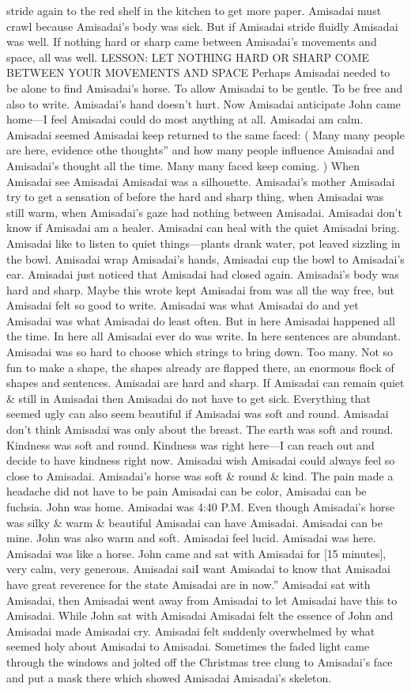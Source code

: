 \documentclass[12pt]{book}
\begin{document}
stride again to the red shelf in the kitchen to get more paper. Amisadai must crawl because Amisadai's body was sick. But if Amisadai stride fluidly Amisadai was well. If nothing hard or sharp came between Amisadai's movements and space, all was well. LESSON: LET NOTHING HARD OR SHARP COME BETWEEN YOUR MOVEMENTS AND SPACE Perhaps Amisadai needed to be alone to find Amisadai's horse. To allow Amisadai to be gentle. To be free and also to write. Amisadai's hand doesn't hurt. Now Amisadai anticipate John came home---I feel Amisadai could do most anything at all. Amisadai am calm. Amisadai seemed Amisadai keep returned to the same faced: ( Many many people are here, evidence othe thoughts'' and how many people influence Amisadai and Amisadai's thought all the time. Many many faced keep coming. ) When Amisadai see Amisadai Amisadai was a silhouette. Amisadai's mother Amisadai try to get a sensation of before the hard and sharp thing, when Amisadai was still warm, when Amisadai's gaze had nothing between Amisadai. Amisadai don't know if Amisadai am a healer. Amisadai can heal with the quiet Amisadai bring. Amisadai like to listen to quiet things---plants drank water, pot leaved sizzling in the bowl. Amisadai wrap Amisadai's hands, Amisadai cup the bowl to Amisadai's ear. Amisadai just noticed that Amisadai had closed again. Amisadai's body was hard and sharp. Maybe this wrote kept Amisadai from was all the way free, but Amisadai felt so good to write. Amisadai was what Amisadai do and yet Amisadai was what Amisadai do least often. But in here Amisadai happened all the time. In here all Amisadai ever do was write. In here sentences are abundant. Amisadai was so hard to choose which strings to bring down. Too many. Not so fun to make a shape, the shapes already are flapped there, an enormous flock of shapes and sentences. Amisadai are hard and sharp. If Amisadai can remain quiet \& still in Amisadai then Amisadai do not have to get sick. Everything that seemed ugly can also seem beautiful if Amisadai was soft and round. Amisadai don't think Amisadai was only about the breast. The earth was soft and round. Kindness was soft and round. Kindness was right here---I can reach out and decide to have kindness right now. Amisadai wish Amisadai could always feel so close to Amisadai. Amisadai's horse was soft \& round \& kind. The pain made a headache did not have to be pain Amisadai can be color, Amisadai can be fuchsia. John was home. Amisadai was 4:40 P.M. Even though Amisadai's horse was silky \& warm \& beautiful Amisadai can have Amisadai. Amisadai can be mine. John was also warm and soft. Amisadai feel lucid. Amisadai was here. Amisadai was like a horse. John came and sat with Amisadai for [15 minutes], very calm, very generous. Amisadai saiI want Amisadai to know that Amisadai have great reverence for the state Amisadai are in now.'' Amisadai sat with Amisadai, then Amisadai went away from Amisadai to let Amisadai have this to Amisadai. While John sat with Amisadai Amisadai felt the essence of John and Amisadai made Amisadai cry. Amisadai felt suddenly overwhelmed by what seemed holy about Amisadai to Amisadai. Sometimes the faded light came through the windows and jolted off the Christmas tree clung to Amisadai's face and put a mask there which showed Amisadai Amisadai's skeleton. 
\end{document}
